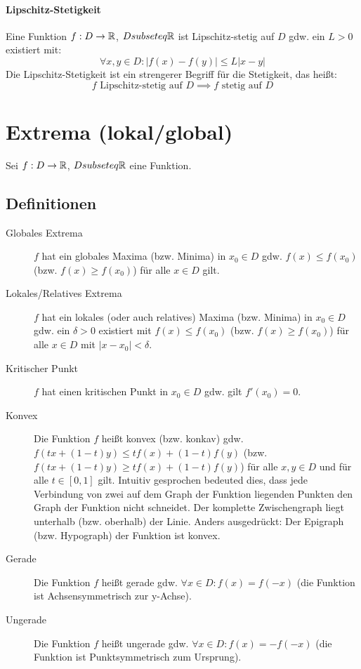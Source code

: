 		\paragraph{Lipschitz-Stetigkeit}
			Eine Funktion $ f : D \rightarrow \mathbb{R} $, $ D subseteq \mathbb{R} $ ist Lipschitz-stetig auf $ D $ gdw. ein $ L > 0 $ existiert mit:
			\begin{equation}
				\forall x, y \in D : \lvert f(x) - f(y) \rvert \leq L \lvert x - y \rvert
			\end{equation}
			Die Lipschitz-Stetigkeit ist ein strengerer Begriff für die Stetigkeit, das heißt: \[ f \text{ Lipschitz-stetig auf } D \implies f \text{ stetig auf } D \]

	\section{Extrema (lokal/global)}
		Sei $ f : D \rightarrow \mathbb{R} $, $ D subseteq \mathbb{R} $ eine Funktion.

		\subsection{Definitionen}
			\begin{description}
				\item[Globales Extrema] $ f $ hat ein globales Maxima (bzw. Minima) in $ x _ 0 \in D $ gdw. $ f(x) \leq f(x _ 0) $ (bzw. $ f(x) \geq f(x _ 0) $) für alle $ x \in D $ gilt.
				\item[Lokales/Relatives Extrema] $ f $ hat ein lokales (oder auch relatives) Maxima (bzw. Minima) in $ x _ 0 \in D $ gdw. ein $ \delta > 0 $ existiert mit $ f(x) \leq f(x _ 0) $ (bzw. $ f(x) \geq f(x _ 0) $) für alle $ x \in D $ mit $ \lvert x - x _ 0 \rvert < \delta $.
				\item[Kritischer Punkt] $ f $ hat einen kritischen Punkt in $ x _ 0 \in D $ gdw. gilt $ f'(x _ 0) = 0 $.
				\item[Konvex] Die Funktion $ f $ heißt konvex (bzw. konkav) gdw. $ f(tx + (1 - t)y) \leq tf(x) + (1 - t)f(y) $ (bzw. $ f(tx + (1 - t)y) \geq tf(x) + (1 - t)f(y) $) für alle $ x, y \in D $ und für alle $ t \in [0, 1] $ gilt. Intuitiv gesprochen bedeuted dies, dass jede Verbindung von zwei auf dem Graph der Funktion liegenden Punkten den Graph der Funktion nicht schneidet. Der komplette Zwischengraph liegt unterhalb (bzw. oberhalb) der Linie. Anders ausgedrückt: Der Epigraph (bzw. Hypograph) der Funktion ist konvex.
				\item[Gerade] Die Funktion $ f $ heißt gerade gdw. $ \forall x \in D : f(x) = f(-x) $ (die Funktion ist Achsensymmetrisch zur y-Achse).
				\item[Ungerade] Die Funktion $ f $ heißt ungerade gdw. $ \forall x \in D : f(x) = -f(-x) $ (die Funktion ist Punktsymmetrisch zum Ursprung).
			\end{description}

